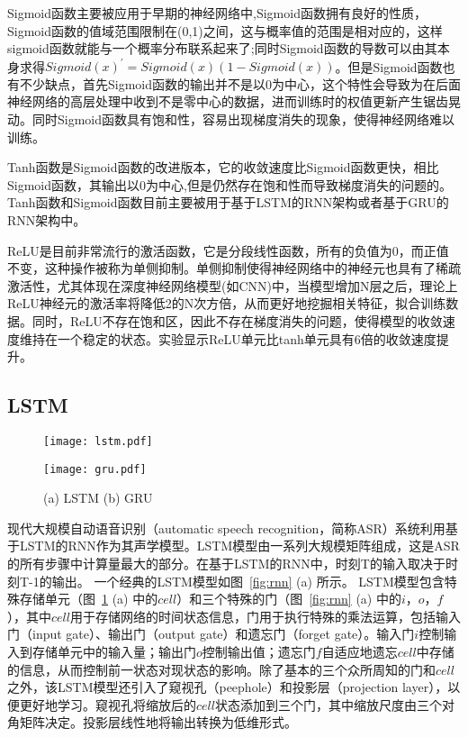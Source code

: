 Sigmoid函数主要被应用于早期的神经网络中,Sigmoid函数拥有良好的性质，Sigmoid函数的值域范围限制在(0,1)之间，这与概率值的范围是相对应的，这样sigmoid函数就能与一个概率分布联系起来了;同时Sigmoid函数的导数可以由其本身求得$Sigmoid(x)^{'}=Sigmoid(x)(1-Sigmoid(x))$。但是Sigmoid函数也有不少缺点，首先Sigmoid函数的输出并不是以0为中心，这个特性会导致为在后面神经网络的高层处理中收到不是零中心的数据，进而训练时的权值更新产生锯齿晃动。同时Sigmoid函数具有饱和性，容易出现梯度消失的现象，使得神经网络难以训练。

Tanh函数是Sigmoid函数的改进版本，它的收敛速度比Sigmoid函数更快，相比Sigmoid函数，其输出以0为中心,但是仍然存在饱和性而导致梯度消失的问题的。Tanh函数和Sigmoid函数目前主要被用于基于LSTM的RNN架构或者基于GRU的RNN架构中。

ReLU是目前非常流行的激活函数，它是分段线性函数，所有的负值为0，而正值不变，这种操作被称为单侧抑制。单侧抑制使得神经网络中的神经元也具有了稀疏激活性，尤其体现在深度神经网络模型(如CNN)中，当模型增加N层之后，理论上ReLU神经元的激活率将降低2的N次方倍，从而更好地挖掘相关特征，拟合训练数据。同时，ReLU不存在饱和区，因此不存在梯度消失的问题，使得模型的收敛速度维持在一个稳定的状态。\cite{krizhevsky2012imagenet}实验显示ReLU单元比tanh单元具有6倍的收敛速度提升。

\subsection{LSTM}

\begin{figure}[h]
\centering
\begin{minipage}[b]{0.45\columnwidth}
\texttt{[image: lstm.pdf]}
\end{minipage}
\hfill
\begin{minipage}[b]{0.45\columnwidth}
\texttt{[image: gru.pdf]}
\end{minipage}
\caption{\footnotesize (a) LSTM (b) GRU}
\label{fig:RNN}
\end{figure}

现代大规模自动语音识别（automatic speech recognition，简称ASR）系统利用基于LSTM的RNN作为其声学模型。LSTM模型由一系列大规模矩阵组成，这是ASR的所有步骤中计算量最大的部分。在基于LSTM的RNN中，时刻T的输入取决于时刻T-1的输出。
一个经典的LSTM模型如图~\ref{fig:rnn} (a) 所示。
LSTM模型包含特殊存储单元（图~\ref{fig:RNN} (a) 中的$cell$）和三个特殊的门（图~\ref{fig:rnn} (a) 中的$i$，$o$，$f$），其中$cell$用于存储网络的时间状态信息，门用于执行特殊的乘法运算，包括输入门（input gate）、输出门（output gate）和遗忘门（forget gate）。输入门$i$控制输入到存储单元中的输入量；输出门$o$控制输出值；遗忘门$f$自适应地遗忘$cell$中存储的信息，从而控制前一状态对现状态的影响。除了基本的三个众所周知的门和$cell$之外，该LSTM模型还引入了窥视孔（peephole）和投影层（projection layer），以便更好地学习。窥视孔将缩放后的$cell$状态添加到三个门，其中缩放尺度由三个对角矩阵决定。投影层线性地将输出转换为低维形式。

